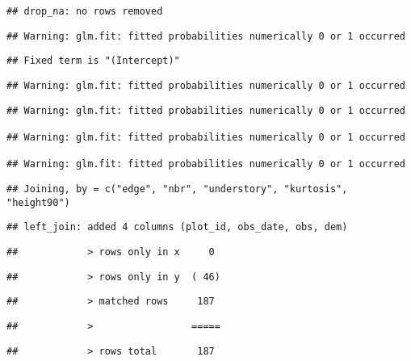 \documentclass[
]{article}
\begin{document}
\begin{verbatim}
## drop_na: no rows removed
\end{verbatim}

\begin{verbatim}
## Warning: glm.fit: fitted probabilities numerically 0 or 1 occurred
\end{verbatim}

\begin{verbatim}
## Fixed term is "(Intercept)"
\end{verbatim}

\begin{verbatim}
## Warning: glm.fit: fitted probabilities numerically 0 or 1 occurred
\end{verbatim}

\begin{verbatim}
## Warning: glm.fit: fitted probabilities numerically 0 or 1 occurred

## Warning: glm.fit: fitted probabilities numerically 0 or 1 occurred

## Warning: glm.fit: fitted probabilities numerically 0 or 1 occurred
\end{verbatim}

\begin{verbatim}
## Joining, by = c("edge", "nbr", "understory", "kurtosis", "height90")
\end{verbatim}

\begin{verbatim}
## left_join: added 4 columns (plot_id, obs_date, obs, dem)
\end{verbatim}

\begin{verbatim}
##            > rows only in x     0
\end{verbatim}

\begin{verbatim}
##            > rows only in y  ( 46)
\end{verbatim}

\begin{verbatim}
##            > matched rows     187
\end{verbatim}

\begin{verbatim}
##            >                 =====
\end{verbatim}

\begin{verbatim}
##            > rows total       187
\end{verbatim}
\end{document}
